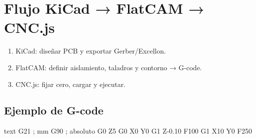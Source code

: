 \chapter{Flujo KiCad → FlatCAM → CNC.js}
\label{ch:workflow}
\begin{enumerate}
  \item KiCad: diseñar PCB y exportar Gerber/Excellon.
  \item FlatCAM: definir aislamiento, taladros y contorno → G-code.
  \item CNC.js: fijar cero, cargar y ejecutar.
\end{enumerate}

\section*{Ejemplo de G-code}
\begin{codeblock}{text}
G21 ; mm
G90 ; absoluto
G0 Z5
G0 X0 Y0
G1 Z-0.10 F100
G1 X10 Y0 F250
\end{codeblock}

